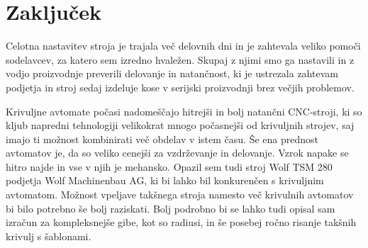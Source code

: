 \newpage
\section{Zaključek}
Celotna nastavitev stroja je trajala več delovnih dni in je
zahtevala veliko pomoči sodelavcev, za katero sem izredno hvaležen.
Skupaj z njimi smo ga nastavili in z vodjo proizvodnje preverili
delovanje in natančnost, ki je ustrezala zahtevam podjetja
in stroj sedaj izdeluje kose v serijski proizvodnji brez večjih problemov.

Krivuljne avtomate počasi nadomeščajo hitrejši in bolj natančni CNC-stroji, ki so kljub
napredni tehnologiji velikokrat mnogo počasnejši od krivuljnih strojev, saj
imajo ti možnost kombinirati več obdelav v istem času. Še ena prednost avtomatov je, da so veliko cenejši
za vzdrževanje in delovanje. Vzrok napake se hitro najde in vse v njih je
mehansko. Opazil sem tudi stroj Wolf TSM 280 podjetja Wolf Machinenbau AG,
ki bi lahko bil konkurenčen s krivuljnim avtomatom. Možnost vpeljave
takšnega stroja namesto več krivulnih avtomatov bi bilo potrebno
še bolj raziskati. Bolj podrobno bi se lahko tudi opisal
sam izračun za kompleksnejše gibe, kot so radiusi, in še posebej
ročno risanje takšnih krivulj s šablonami.